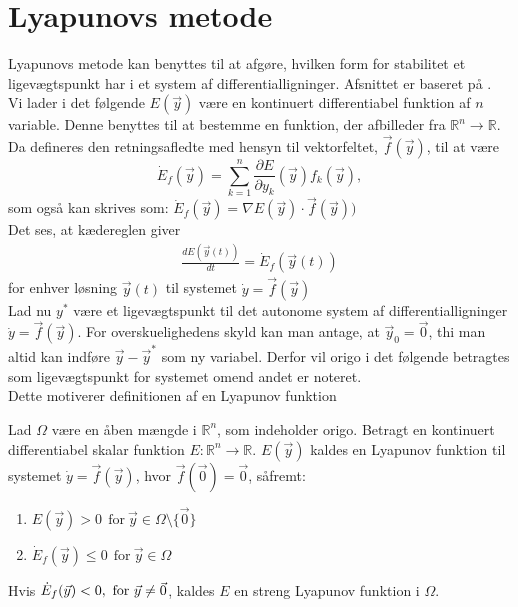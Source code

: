 \section{Lyapunovs metode}
Lyapunovs metode kan benyttes til at afgøre, hvilken form for stabilitet et ligevægtspunkt har i et system af differentialligninger. Afsnittet er baseret på \citep[s. 266-277]{Svensk}.\\
\hfill \break
Vi lader i det følgende $E(\vec{y})$ være en kontinuert differentiabel funktion af $n$ variable. Denne benyttes til at bestemme en funktion, der afbilleder fra $\mathbb{R}^n \to \mathbb{R}$. Da defineres den retningsafledte med hensyn til vektorfeltet, $\vec{f}(\vec{y})$, til at være 
\begin{equation}
\dot{E}_f(\vec{y})=\sum_{k=1}^{n} \frac{\partial E}{\partial y_k}(\vec{y}) f_k(\vec{y}),
\end{equation}
som også kan skrives som: $\dot{E}_f(\vec{y})=\nabla E(\vec{y}) \cdot \vec{f}(\vec{y}))$\\
\hfill \break
Det ses, at kædereglen giver
\begin{align}
\frac{dE(\vec{y}(t))}{dt}=\dot{E}_f(\vec{y}(t))
\end{align}
for enhver løsning $\vec{y}(t)$ til systemet $\dot{y}=\vec{f}(\vec{y})$\\
\hfill \break
Lad nu $y^*$ være et ligevægtspunkt til det autonome system af differentialligninger $\dot{y}=\vec{f}(\vec{y})$. For overskuelighedens skyld kan man antage, at $\vec{y}_0=\vec{0}$, thi man altid kan indføre $\vec{y}-\vec{y}^*$ som ny variabel. Derfor vil origo i det følgende betragtes som ligevægtspunkt for systemet omend andet er noteret.\\
\hfill \break
Dette motiverer definitionen af en Lyapunov funktion

\begin{definition}\label{lyafunk}
Lad $\Omega$ være en åben mængde i $\mathbb{R}^n$, som indeholder origo. Betragt en kontinuert differentiabel skalar funktion $E: \mathbb{R}^n \rightarrow \mathbb{R}$.
$E(\vec{y})$ kaldes en Lyapunov funktion til systemet $\dot{y}=\vec{f}(\vec{y})$, hvor $\vec{f}(\vec{0})=\vec{0}$, såfremt:
\begin{enumerate}
  \item $E(\vec{y})>0 \ \ \text{for} \ \vec{y} \in \Omega \setminus \{\vec{0}\}$
  \item $\dot{E}_f(\vec{y})\leq 0 \ \ \text{for} \ \vec{y} \in \Omega$
\end{enumerate}
Hvis $\dot{E}_f(\vec{y})<0, \ \textnormal{for} \ \vec{y}\neq \vec{0}$, kaldes $E$ en streng Lyapunov funktion i $\Omega$.
  \end{definition}
  
